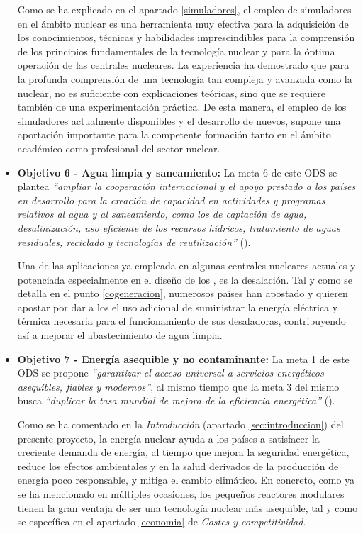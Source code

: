 \begin{itemize}
    Como se ha explicado en el apartado \ref{simuladores}, el empleo de simuladores en el ámbito nuclear es una herramienta muy efectiva para la adquisición de los conocimientos, técnicas y habilidades imprescindibles para la comprensión de los principios fundamentales de la tecnología nuclear y para la óptima operación de las centrales nucleares. La experiencia ha demostrado que para la profunda comprensión de una tecnología tan compleja y avanzada como la nuclear, no es suficiente con explicaciones teóricas, sino que se requiere también de una experimentación práctica.  De esta manera, el empleo de los simuladores actualmente disponibles y el desarrollo de nuevos, supone una aportación importante para la competente formación tanto en el ámbito académico como profesional del sector nuclear.

    \item \textbf{Objetivo 6 - Agua limpia y saneamiento:} La meta 6 de este ODS se plantea \textit{``ampliar la cooperación internacional y el apoyo prestado a los países en desarrollo para la creación de capacidad en actividades y programas relativos al agua y al saneamiento, como los de captación de agua, desalinización, uso eficiente de los recursos hídricos, tratamiento de aguas residuales, reciclado y tecnologías de reutilización''} (\cite{ODS}).
    
    Una de las aplicaciones ya empleada en algunas centrales nucleares actuales y potenciada especialmente en el diseño de los , es la desalación. Tal y como se detalla en el punto \ref{cogeneracion}, numerosos países han apostado y quieren apostar por dar a los  el uso adicional de suministrar la energía eléctrica y térmica necesaria para el funcionamiento de sus desaladoras, contribuyendo así a mejorar el abastecimiento de agua limpia.

    \item \textbf{Objetivo 7 - Energía asequible y no contaminante:} La meta 1 de este ODS se propone \textit{``garantizar el acceso universal a servicios energéticos asequibles, fiables y modernos''}, al mismo tiempo que la meta 3 del mismo busca \textit{``duplicar la tasa mundial de mejora de la eficiencia energética''} (\cite{ODS}).
    
    Como se ha comentado en la \textit{Introducción} (apartado \ref{sec:introduccion}) del presente proyecto, la energía nuclear ayuda a los países a satisfacer la creciente demanda de energía, al tiempo que mejora la seguridad energética, reduce los efectos ambientales y en la salud derivados de la producción de energía poco responsable, y mitiga el cambio climático. En concreto, como ya se ha mencionado en múltiples ocasiones, los pequeños reactores modulares tienen la gran ventaja de ser una tecnología nuclear más asequible, tal y como se específica en el apartado \ref{economia} de \textit{Costes y competitividad}.


\end{itemize}
